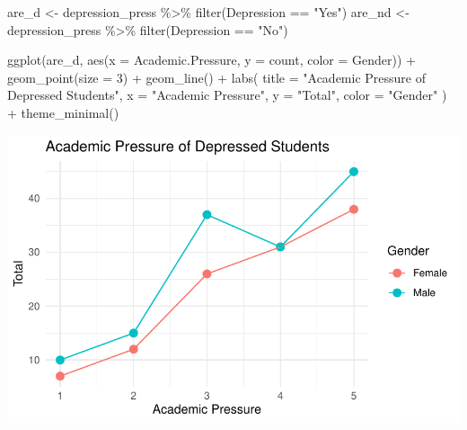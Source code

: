 \documentclass[
  letterpaper,
  DIV=11,
  numbers=noendperiod]{scrartcl}
\newenvironment{Shaded}{\begin{snugshade}}{\end{snugshade}}
\newcommand{\AttributeTok}[1]{\textcolor[rgb]{0.40,0.45,0.13}{#1}}
\newcommand{\DecValTok}[1]{\textcolor[rgb]{0.68,0.00,0.00}{#1}}
\newcommand{\FunctionTok}[1]{\textcolor[rgb]{0.28,0.35,0.67}{#1}}
\newcommand{\NormalTok}[1]{\textcolor[rgb]{0.00,0.23,0.31}{#1}}
\newcommand{\OtherTok}[1]{\textcolor[rgb]{0.00,0.23,0.31}{#1}}
\newcommand{\SpecialCharTok}[1]{\textcolor[rgb]{0.37,0.37,0.37}{#1}}
\newcommand{\StringTok}[1]{\textcolor[rgb]{0.13,0.47,0.30}{#1}}
\begin{document}
\begin{Shaded}
\begin{Highlighting}[]
\NormalTok{are\_d }\OtherTok{\textless{}{-}}\NormalTok{ depression\_press }\SpecialCharTok{\%\textgreater{}\%} \FunctionTok{filter}\NormalTok{(Depression }\SpecialCharTok{==} \StringTok{"Yes"}\NormalTok{)}
\NormalTok{are\_nd }\OtherTok{\textless{}{-}}\NormalTok{ depression\_press }\SpecialCharTok{\%\textgreater{}\%} \FunctionTok{filter}\NormalTok{(Depression }\SpecialCharTok{==} \StringTok{"No"}\NormalTok{)}

\FunctionTok{ggplot}\NormalTok{(are\_d, }\FunctionTok{aes}\NormalTok{(}\AttributeTok{x =}\NormalTok{ Academic.Pressure, }\AttributeTok{y =}\NormalTok{ count, }\AttributeTok{color =}\NormalTok{ Gender)) }\SpecialCharTok{+}
  \FunctionTok{geom\_point}\NormalTok{(}\AttributeTok{size =} \DecValTok{3}\NormalTok{) }\SpecialCharTok{+}    
  \FunctionTok{geom\_line}\NormalTok{() }\SpecialCharTok{+}       
  \FunctionTok{labs}\NormalTok{(}
    \AttributeTok{title =} \StringTok{"Academic Pressure of Depressed Students"}\NormalTok{,}
    \AttributeTok{x =} \StringTok{"Academic Pressure"}\NormalTok{,}
    \AttributeTok{y =} \StringTok{"Total"}\NormalTok{,}
    \AttributeTok{color =} \StringTok{"Gender"}
\NormalTok{  ) }\SpecialCharTok{+}
  \FunctionTok{theme\_minimal}\NormalTok{() }
\end{Highlighting}
\end{Shaded}

\includegraphics{Data_files/figure-pdf/unnamed-chunk-4-1.pdf}
\end{document}
